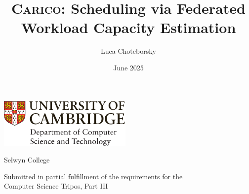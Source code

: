 \documentclass[12pt,a4paper,twoside]{report}
\title{\protect\textsc{Carico}: Scheduling via Federated Workload Capacity Estimation}
\author{Luca Choteborsky}
\date{June 2025}
\newif\ifsubmission %
\newcommand{\candidatenumber}{1234N}
\newcommand{\college}{Selwyn College}
\newcommand{\coursethe}{Computer Science Tripos, Part III}
\begin{document}

\begin{sffamily} %

\begin{titlepage}
\makeatletter

\hspace*{-14mm}\includegraphics[width=65mm]{logo-dcst-colour}

\ifsubmission

\begin{Large}
\vspace{20mm}
Research project report title page

\vspace{35mm}
Candidate \candidatenumber

\vspace{42mm}
\textsl{``\@title''}

\end{Large}

\else

\begin{center}
\Huge
\vspace{\fill}

\@title
\vspace{\fill}

\@author
\vspace{10mm}

\Large
\college
\vspace{\fill}

\@date
\vspace{\fill}

\end{center}

\fi

\vspace{\fill}
\begin{center}
Submitted in partial fulfillment of the requirements for the\\
\coursethe
\end{center}

\makeatother
\end{titlepage}


\end{sffamily}
\end{document}
